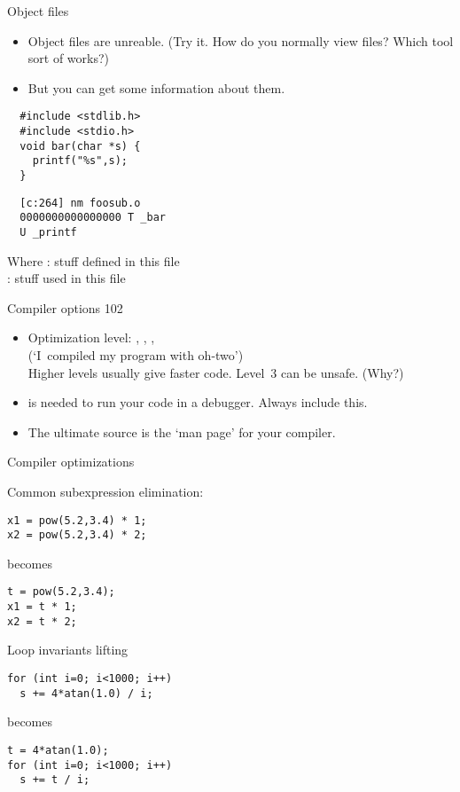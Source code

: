\documentclass[11pt,headernav]{beamer}
\begin{document}
\begin{numberedframe}{Object files}
  \label{sl-tut:object}
  \begin{itemize}
  \item Object files are unreable. (Try it. How do you normally view files?
    Which tool sort of works?)
  \item But you can get some information about them.
  \end{itemize}
  \begin{multicols}{2}
    \small
\begin{verbatim}
  #include <stdlib.h>
  #include <stdio.h>
  void bar(char *s) {
    printf("%s",s);
  }
\end{verbatim}
\columnbreak
\begin{verbatim}
  [c:264] nm foosub.o
  0000000000000000 T _bar
  U _printf
\end{verbatim}
 Where : stuff defined in this file\\
  : stuff used in this file
  \end{multicols}
\end{numberedframe}

\begin{numberedframe}{Compiler options 102}
  \label{sl-tut:options2}
  \begin{itemize}
  \item Optimization level: , , , \\
    (`I~compiled my program with oh-two')\\
    Higher levels usually give faster code. Level~3 can be unsafe. (Why?)
  \item {} is needed to run your code in a debugger. Always include this.
  \item The ultimate source is the `man page' for your compiler.
  \end{itemize}
\end{numberedframe}

\begin{numberedframe}{Compiler optimizations}
\begin{multicols}{2}
  Common subexpression elimination:
\begin{lstlisting}
x1 = pow(5.2,3.4) * 1;    
x2 = pow(5.2,3.4) * 2;
\end{lstlisting}
  becomes
\begin{lstlisting}
t = pow(5.2,3.4);
x1 = t * 1;    
x2 = t * 2;
\end{lstlisting}
\columnbreak
Loop invariants lifting
\begin{lstlisting}
for (int i=0; i<1000; i++)
  s += 4*atan(1.0) / i;
\end{lstlisting}
becomes
\begin{lstlisting}
t = 4*atan(1.0);
for (int i=0; i<1000; i++)
  s += t / i;
\end{lstlisting}
\end{multicols}
\end{numberedframe}
\end{document}
